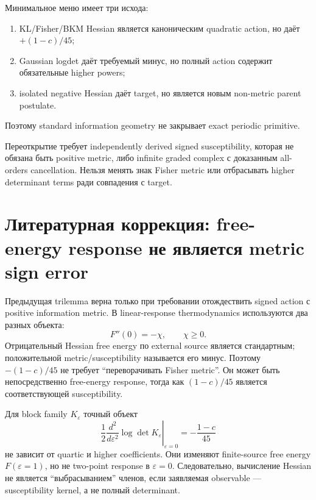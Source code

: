 \begin{theorem}
Минимальное меню имеет три исхода:
\begin{enumerate}
 \item KL/Fisher/BKM Hessian является каноническим quadratic action, но даёт
 \(+ (1-c)/45\);
 \item Gaussian logdet даёт требуемый минус, но полный action содержит
 обязательные higher powers;
 \item isolated negative Hessian даёт target, но является новым
 non-metric parent postulate.
\end{enumerate}
Поэтому standard information geometry не закрывает exact periodic primitive.
\end{theorem}

\begin{nogocriterion}
Переоткрытие требует independently derived signed susceptibility, которая не
обязана быть positive metric, либо infinite graded complex с доказанным
all-orders cancellation. Нельзя менять знак Fisher metric или отбрасывать
higher determinant terms ради совпадения с target.
\end{nogocriterion}

\section{Литературная коррекция: free-energy response не является metric sign error}

Предыдущая trilemma верна только при требовании отождествить signed action с
positive information metric. В linear-response thermodynamics используются
два разных объекта:
\begin{equation}
 F''(0)=-\chi,
 \qquad
 \chi\ge0.
\end{equation}
Отрицательный Hessian free energy по external source является стандартным;
положительной metric/susceptibility называется его минус. Поэтому
\(- (1-c)/45\) не требует ``переворачивать Fisher metric''. Он может быть
непосредственно free-energy response, тогда как \((1-c)/45\) является
соответствующей susceptibility.

Для block family \(K_\varepsilon\) точный объект
\begin{equation}
 \left.\frac12\frac{d^2}{d\varepsilon^2}
 \log\det K_\varepsilon\right|_{\varepsilon=0}
 =-\frac{1-c}{45}
\end{equation}
не зависит от quartic и higher coefficients. Они изменяют finite-source
free energy \(F(\varepsilon=1)\), но не two-point response в
\(\varepsilon=0\). Следовательно, вычисление Hessian не является
``выбрасыванием'' членов, если заявляемая observable --- susceptibility
kernel, а не полный determinant.


